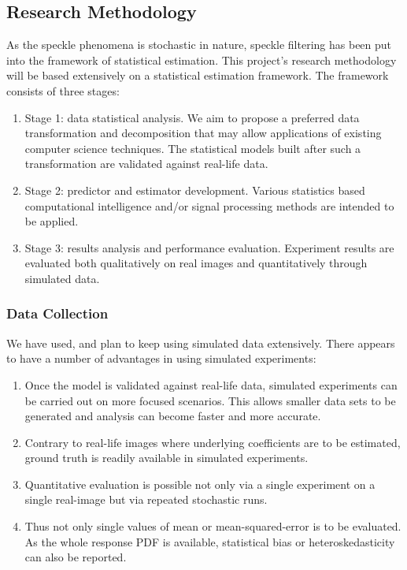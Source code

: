 \subsection{Research Methodology}

As the speckle phenomena is stochastic in nature, speckle filtering has been put into the framework of statistical estimation.
This project's research methodology will be based extensively on a statistical estimation framework. 
The framework consists of three stages:

\begin{enumerate}
\item Stage 1: data statistical analysis. 
We aim to propose a preferred data transformation and decomposition that may allow applications of existing computer science techniques. 
The statistical models built after such a transformation are validated against real-life data.
\item Stage 2: predictor and estimator development.
Various statistics based computational intelligence and/or signal processing methods are intended to be applied. 
\item Stage 3: results analysis and performance evaluation.
Experiment results are evaluated both qualitatively on real images and quantitatively through simulated data. 
\end{enumerate}

\subsubsection{Data Collection}

We have used, and plan to keep using simulated data extensively. 
There appears to have a number of advantages in using simulated experiments:
\begin{enumerate}
\item Once the model is validated against real-life data, simulated experiments can be carried out on more focused scenarios.
This allows smaller data sets to be generated and analysis can become faster and more accurate.
\item Contrary to real-life images where underlying coefficients are to be estimated, ground truth is readily available in simulated experiments.
\item Quantitative evaluation is possible not only via a single experiment on a single real-image but via repeated stochastic runs. 
\item Thus not only single values of mean or mean-squared-error is to be evaluated. 
As the whole response PDF is available, statistical bias or heteroskedasticity can also be reported.
\end{enumerate}

